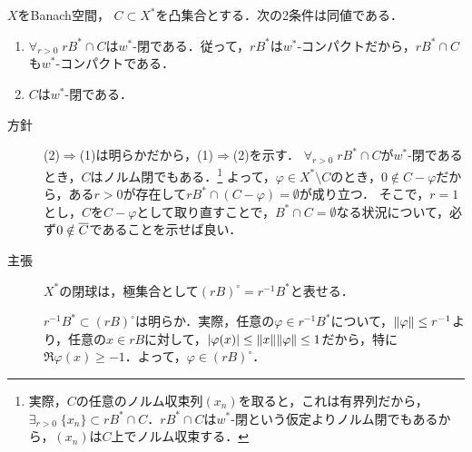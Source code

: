 \documentclass[uplatex,dvipdfmx]{jsreport}
\begin{document}
\begin{theorem}
    $X$をBanach空間，
    $C\subset X^*$を凸集合とする．次の2条件は同値である．
    \begin{enumerate}
        \item $\forall_{r>0}\;rB^*\cap C$は$w^*$-閉である．従って，$rB^*$は$w^*$-コンパクトだから，$rB^*\cap C$も$w^*$-コンパクトである．
        \item $C$は$w^*$-閉である．
    \end{enumerate}
\end{theorem}
\begin{Proof}\mbox{}
    \begin{description}
        \item[方針] (2)$\Rightarrow$(1)は明らかだから，(1)$\Rightarrow$(2)を示す．
        $\forall_{r>0}\;rB^*\cap C$が$w^*$-閉であるとき，$C$はノルム閉でもある．\footnote{実際，$C$の任意のノルム収束列$(x_n)$を取ると，これは有界列だから，$\exists_{r>0}\;\{x_n\}\subset rB^*\cap C$．$rB^*\cap C$は$w^*$-閉という仮定よりノルム閉でもあるから，$(x_n)$は$C$上でノルム収束する．}
        よって，$\varphi\in X^*\setminus C$のとき，$0\notin C-\varphi$だから，ある$r>0$が存在して$rB^*\cap(C-\varphi)=\emptyset$が成り立つ．
        そこで，$r=1$とし，$C$を$C-\varphi$として取り直すことで，$B^*\cap C=\emptyset$なる状況について，必ず$0\notin\overline{C}$であることを示せば良い．
        \item[主張] $X^*$の閉球は，極集合として$(rB)^\circ=r^{-1}B^*$と表せる．
        
        $r^{-1}B^*\subset(rB)^\circ$は明らか．実際，任意の$\varphi\in r^{-1}B^*$について，$\|\varphi\|\le r^{-1}$より，任意の$x\in rB$に対して，$\lvert\varphi(x)\rvert\le\|x\|\|\varphi\|\le1$だから，特に$\Re\varphi(x)\ge-1$．よって，$\varphi\in(rB)^\circ$．


\end{description}
\end{Proof}
\end{document}
